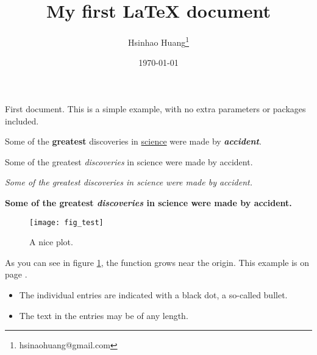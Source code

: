 \documentclass[12pt, a4paper]{article} %
\title{My first LaTeX document}                            %
\author{Hsinhao Huang\thanks{hsinaohuang@gmail.com}}       %
\date{\today}                                              %
\begin{document}

    \maketitle

    First document. This is a simple example, with no
    extra parameters or packages included.

    Some of the \textbf{greatest}                          %
    discoveries in \underline{science}                     %
    were made by \textbf{\textit{accident}}.               %

    Some of the greatest \emph{discoveries} in science
    were made by accident.

    \textit{Some of the greatest \emph{discoveries}        %
    in science were made by accident.}

    \textbf{Some of the greatest \emph{discoveries}
    in science were made by accident.}

    \begin{figure}[h]
        \centering
        \texttt{[image: fig\_test]}   %
        \caption
        {
            A nice plot.
        }
        \label{fig:test}
    \end{figure}

    As you can see in figure \ref{fig:test},
    the function grows near the origin.
    This example is on page \pageref{fig:test}.

    \begin{itemize}                                        %
        \item The individual entries are indicated with
              a black dot, a so-called bullet.
        \item The text in the entries may be of any length.
    \end{itemize}
\end{document}
